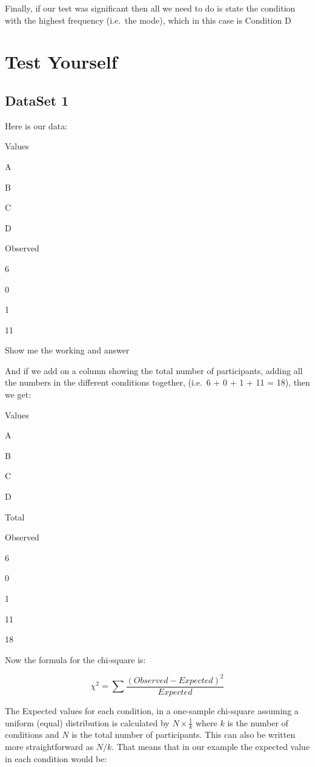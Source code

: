 \documentclass[
  oneside]{book}
\begin{document}
Finally, if our test was significant then all we need to do is state the condition with the highest frequency (i.e.~the mode), which in this case is Condition D

\hypertarget{test-yourself}{%
\section{Test Yourself}\label{test-yourself}}

\hypertarget{dataset-1}{%
\subsection{DataSet 1}\label{dataset-1}}

Here is our data:

Values

A

B

C

D

Observed

6

0

1

11

Show me the working and answer

And if we add on a column showing the total number of participants, adding all the numbers in the different conditions together, (i.e.~6 + 0 + 1 + 11 = 18), then we get:

Values

A

B

C

D

Total

Observed

6

0

1

11

18

Now the formula for the chi-square is:

\[\chi^2 = \sum\frac{(Observed - Expected)^2}{Expected}\]

The Expected values for each condition, in a one-sample chi-square assuming a uniform (equal) distribution is calculated by \(N \times \frac{1}{k}\) where \(k\) is the number of conditions and \(N\) is the total number of participants. This can also be written more straightforward as \(N/k\). That means that in our example the expected value in each condition would be:
\end{document}
